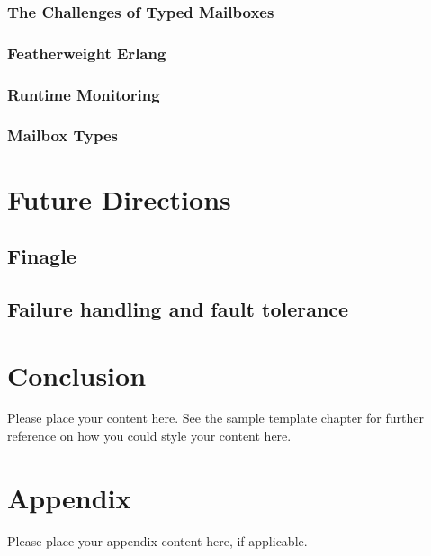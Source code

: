 \documentclass[
graybox,
envcountchap,
]{svmult}
\begin{document}
\begin{bibunit}
  \subsubsection{The Challenges of Typed Mailboxes}
  \subsubsection{Featherweight Erlang}
  \subsubsection{Runtime Monitoring}
  \subsubsection{Mailbox Types}

  \section{Future Directions}
  \subsection{Finagle}
  \subsection{Failure handling and fault tolerance}

  \section{Conclusion}

	Please place your content here. See the sample template chapter for further reference on how you could style your content here.


	\section*{Appendix}\label{appendix}

	Please place your appendix content here, if applicable.




\end{bibunit}
\end{document}

